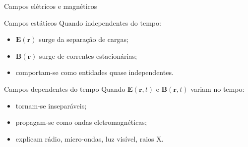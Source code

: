\documentclass[aspectratio=169]{beamer}
\newcommand{\blue}[1]{\textcolor{myblue}{#1}}
\newcommand{\red}[1]{\textcolor{myred}{#1}}
\begin{document}
\begin{frame}{Campos elétricos e magnéticos}
\begin{block}{Campos estáticos}
Quando independentes do tempo:
\begin{itemize}
  \item $\bm E(\bm r)$ surge da separação de cargas;
  \item $\bm B(\bm r)$ surge de correntes estacionárias;
  \item comportam-se como entidades quase independentes.
\end{itemize}
\end{block}

\begin{block}{Campos dependentes do tempo}
Quando $\bm E(\bm r,t)$ e $\bm B(\bm r,t)$ variam no tempo:
\begin{itemize}
  \item tornam-se \red{inseparáveis};
  \item propagam-se como \blue{ondas eletromagnéticas};
  \item explicam rádio, micro-ondas, luz visível, raios X.
\end{itemize}
\end{block}
\end{frame}
\end{document}
